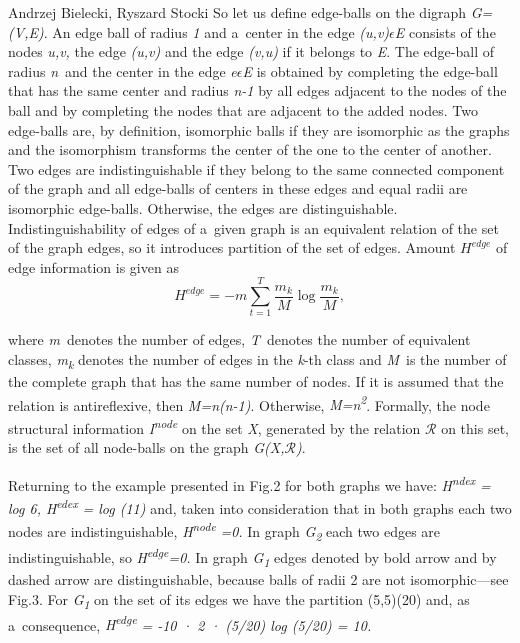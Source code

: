 \begin{artengenv2auth}{Andrzej Bielecki, Ryszard Stocki}
So let us define edge-balls on the digraph \textit{G=(V,E)}. An edge ball of radius \textit{1} and a~center in the edge \textit{(u,v)$\epsilon $E} consists of the nodes \textit{u,v,} the edge \textit{(u,v)} and the edge \textit{(v,u)} if it belongs to \textit{E}. The edge-ball of radius \textit{n}~and the center in the edge \textit{e$\epsilon $E} is obtained by completing the edge-ball that has the same center and radius \textit{n-1} by all edges adjacent to the nodes of the ball and by completing the nodes that are adjacent to the added nodes. Two edge-balls are, by definition, isomorphic balls if they are isomorphic as the graphs and the isomorphism transforms the center of the one to the center of another. Two edges are indistinguishable if they belong to the same connected component of the graph and all edge-balls of centers in these edges and equal radii are isomorphic edge-balls. Otherwise, the edges are distinguishable. Indistinguishability of edges of a~given graph is an equivalent relation of the set of the graph edges, so it introduces partition of the set of edges. Amount $H^{\textit{edge}}$ of edge information is given as
\begingroup
\reqnos
\begin{equation}
H^{\textit{edge}}=-m\sum _{t=1}^T\frac{m_k} M\log \frac{m_k} M,
\end{equation}
\endgroup




where \textit{m}~denotes the number of edges, \textit{T}~denotes the number of equivalent classes, \textit{m}\textit{\textsubscript{k}} denotes the number of edges in the \textit{k}{}-th class and \textit{M}~is the number of the complete graph that has the same number of nodes. If it is assumed that the relation is antireflexive, then \textit{M=n(n-1)}. Otherwise, \textit{M=n}\textit{\textsuperscript{2}}.  Formally, the node structural information \textit{I}\textit{\textsuperscript{node}} on the set \textit{X}, generated by the relation $\mathcal{R}$ on this set, is the set of all node-balls on the graph \textit{G(X,$\mathcal{R}$)}.



Returning to the example presented in Fig.2 for both graphs we have: \textit{H}\textit{\textsuperscript{ndex}} \textit{= log 6, H}\textit{\textsuperscript{edex}} \textit{= log (11)} and, taken into consideration that in both graphs each two nodes are indistinguishable, \textit{H}\textit{\textsuperscript{node}} \textit{=0.} In graph \textit{G}\textit{\textsubscript{2}} each two edges are indistinguishable, so \textit{H}\textit{\textsuperscript{edge}}\textit{=0.} In graph \textit{G}\textit{\textsubscript{1}} edges denoted by bold arrow and by dashed arrow are distinguishable, because balls of radii 2 are not isomorphic---see Fig.3. For \textit{G}\textit{\textsubscript{1}} on the set of its edges we have the partition (5,5)(20) and, as a~consequence, \textit{H}\textit{\textsuperscript{edge}} \textit{= -10 · 2 · (5/20) log (5/20) = 10.} 



\end{artengenv2auth}
